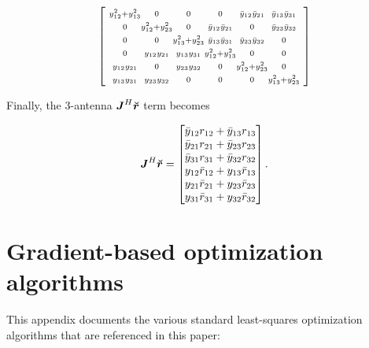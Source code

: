 \documentclass[useAMS,usenatbib]{mn2e}
\makeatletter
\newcommand{\mat}[1]{{\bmath{#1}}}
\newcommand{\JJ}{\mat{J}} %
\newcommand{\Matrix}[2]{\left [ \begin{array}{@{}#1@{}}#2\end{array} \right ]}
\newcommand{\AUG}[1]{\bmath{\breve{#1}}}
\newcommand{\Rr}{\AUG{r}}
\makeatother
\begin{document}
\begin{equation}
\label{eq:JHJ:3ant}
\Matrix{@{~}c@{}c@{}c@{}c@{}c@{}c@{~}}{
\scriptstyle\yysq{12}{13} &\scriptstyle 0             &\scriptstyle 0             &\scriptstyle 0             &\scriptstyle \bb{1}{2}       &\scriptstyle \bb{1}{3} \\
\scriptstyle0             &\scriptstyle \yysq{12}{23} &\scriptstyle 0             &\scriptstyle \bb{1}{2}       &\scriptstyle 0             &\scriptstyle \bb{2}{3} \\
\scriptstyle0             &\scriptstyle 0             &\scriptstyle \yysq{13}{23} &\scriptstyle \bb{1}{3}       &\scriptstyle \bb{2}{3}       &\scriptstyle 0       \\
\scriptstyle0             &\scriptstyle \bbb{1}{2}      &\scriptstyle \bbb{1}{3}      &\scriptstyle \yysq{12}{13} &\scriptstyle 0             &\scriptstyle 0       \\ 
\scriptstyle\bbb{1}{2}      &\scriptstyle 0             &\scriptstyle \bbb{2}{3}      &\scriptstyle 0             &\scriptstyle \yysq{12}{23} &\scriptstyle 0 \\
\scriptstyle\bbb{1}{3}      &\scriptstyle \bbb{2}{3}      &\scriptstyle 0             &\scriptstyle 0             &\scriptstyle 0             &\scriptstyle  \yysq{13}{23} \\
}
\end{equation}

Finally, the 3-antenna $\JJ^H\Rr$ term becomes

\begin{equation}
\label{eq:JHR:3ant}
\JJ^H\Rr = \Matrix{c}{
\bar{y}_{12} r_{12} + \bar{y}_{13} r_{13} \\
\bar{y}_{21} r_{21} + \bar{y}_{23} r_{23} \\
\bar{y}_{31} r_{31} + \bar{y}_{32} r_{32} \\
y_{12} \bar{r}_{12} + y_{13} \bar{r}_{13}   \\
y_{21} \bar{r}_{21} + y_{23} \bar{r}_{23}   \\
y_{31} \bar{r}_{31} + y_{32} \bar{r}_{32}   \\
}.
\end{equation}

\section{Gradient-based optimization algorithms}
\label{sec:algs}

This appendix documents the various standard least-squares optimization algorithms 
that are referenced in this paper:
\end{document}
